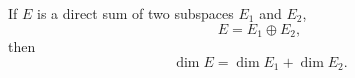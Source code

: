 If $E$ is a direct sum of two subspaces $E_1$ and $E_2$,
$$E = E_1 \oplus E_2,$$
then
$$\dim E = \dim E_1 + \dim E_2.$$

